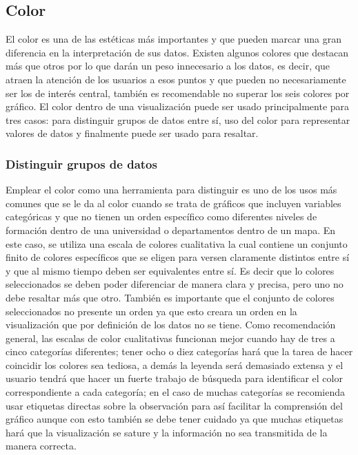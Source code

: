 \documentclass[
]{book}
\begin{document}
\hypertarget{color}{%
\subsection{Color}\label{color}}

El color es una de las estéticas más importantes y que pueden marcar una gran diferencia en la interpretación de sus datos. Existen algunos colores que destacan más que otros por lo que darán un peso innecesario a los datos, es decir, que atraen la atención de los usuarios a esos puntos y que pueden no necesariamente ser los de interés central, también es recomendable no superar los seis colores por gráfico. El color dentro de una visualización puede ser usado principalmente para tres casos: para distinguir grupos de datos entre sí, uso del color para representar valores de datos y finalmente puede ser usado para resaltar.

\hypertarget{distinguir-grupos-de-datos}{%
\subsubsection{Distinguir grupos de datos}\label{distinguir-grupos-de-datos}}

Emplear el color como una herramienta para distinguir es uno de los usos más comunes que se le da al color cuando se trata de gráficos que incluyen variables categóricas y que no tienen un orden específico como diferentes niveles de formación dentro de una universidad o departamentos dentro de un mapa. En este caso, se utiliza una escala de colores cualitativa la cual contiene un conjunto finito de colores específicos que se eligen para versen claramente distintos entre sí y que al mismo tiempo deben ser equivalentes entre sí. Es decir que lo colores seleccionados se deben poder diferenciar de manera clara y precisa, pero uno no debe resaltar más que otro. También es importante que el conjunto de colores seleccionados no presente un orden ya que esto creara un orden en la visualización que por definición de los datos no se tiene. Como recomendación general, las escalas de color cualitativas funcionan mejor cuando hay de tres a cinco categorías diferentes; tener ocho o diez categorías hará que la tarea de hacer coincidir los colores sea tediosa, a demás la leyenda será demasiado extensa y el usuario tendrá que hacer un fuerte trabajo de búsqueda para identificar el color correspondiente a cada categoría; en el caso de muchas categorías se recomienda usar etiquetas directas sobre la observación para así facilitar la comprensión del gráfico aunque con esto también se debe tener cuidado ya que muchas etiquetas hará que la visualización se sature y la información no sea transmitida de la manera correcta.
\end{document}
